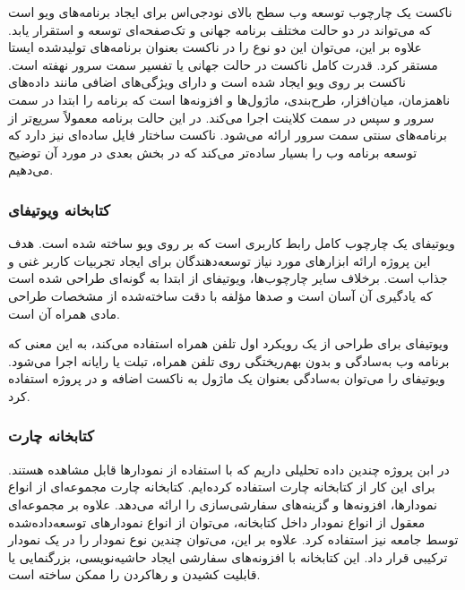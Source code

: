 ناکست یک چارچوب توسعه وب سطح بالای نودجی‌اس برای ایجاد برنامه‌های ویو است که می‌تواند در دو حالت مختلف برنامه جهانی و تک‌صفحه‌ای توسعه و استقرار یابد. علاوه بر این، می‌توان این دو نوع را در ناکست بعنوان برنامه‌های تولیدشده ایستا مستقر کرد. قدرت کامل ناکست در حالت جهانی یا تفسیر سمت سرور نهفته است. ناکست بر روی ویو ایجاد شده است و دارای ویژگی‌های اضافی مانند داده‌های ناهمزمان، میان‌افزار، طرح‌بندی، ماژول‌ها و افزونه‌ها است که برنامه را ابتدا در سمت سرور و سپس در سمت کلاینت اجرا می‌کند. در این حالت برنامه معمولاً سریع‌تر از برنامه‌های سنتی سمت سرور ارائه می‌شود\cite{kok2020hands}. ناکست ساختار فایل ساده‌ای نیز دارد که توسعه برنامه وب را بسیار ساده‌تر می‌کند که در بخش بعدی در مورد آن توضیح می‌دهیم.


\subsubsection{کتابخانه ویوتیفای}

ویوتیفای یک چارچوب کامل رابط کاربری است که بر روی ویو ساخته شده است. هدف این پروژه ارائه ابزارهای مورد نیاز توسعه‌دهندگان برای ایجاد تجربیات کاربر غنی و جذاب است. برخلاف سایر چارچوب‌ها، ویوتیفای از ابتدا به گونه‌ای طراحی شده است که یادگیری آن آسان است و صدها مؤلفه با دقت ساخته‌شده از مشخصات طراحی مادی همراه آن است\cite{vuetify}.

ویوتیفای برای طراحی از یک رویکرد اول تلفن همراه استفاده می‌کند، به این معنی که برنامه وب به‌سادگی و بدون بهم‌ریختگی روی تلفن همراه، تبلت یا رایانه اجرا می‌شود. ویوتیفای را می‌توان به‌سادگی بعنوان یک ماژول به ناکست اضافه و در پروژه استفاده کرد\cite{vuetify}.


\subsubsection{کتابخانه چارت}

در ابن پروژه چندین داده تحلیلی داریم که با استفاده از نمودارها قابل مشاهده هستند. برای این کار از کتابخانه چارت‌ استفاده کرده‌ایم. کتابخانه چارت مجموعه‌ای از انواع نمودارها، افزونه‌ها و گزینه‌های سفارشی‌سازی را ارائه می‌دهد. علاوه بر مجموعه‌ای معقول از انواع نمودار داخل کتابخانه، می‌توان از انواع نمودارهای توسعه‌داده‌شده توسط جامعه نیز استفاده کرد. علاوه بر این، می‌توان چندین نوع نمودار را در یک نمودار ترکیبی قرار داد. این کتابخانه با افزونه‌های سفارشی ایجاد حاشیه‌نویسی، بزرگنمایی یا قابلیت کشیدن و رهاکردن را ممکن ساخته است\cite{chart}.

